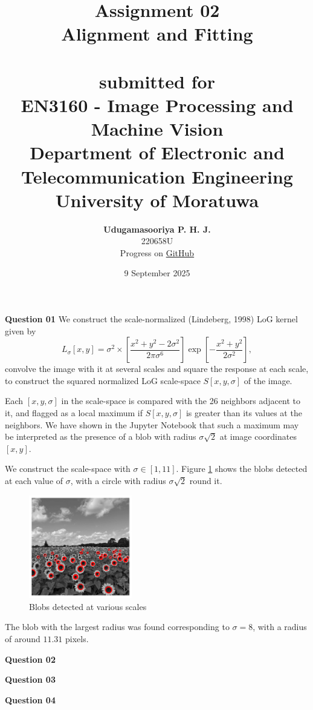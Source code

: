 \documentclass{article}[a4paper]
\title{
	\huge{\textbf{
		Assignment 02
	}}\\
	\Large{
		Alignment and Fitting
	}\\
	\large{\phantom{}}\\
	\large{
		submitted for
	}\\
	\LARGE{
		\textbf{EN3160 - Image Processing and Machine Vision}
	}\\
	\large{
		Department of Electronic and Telecommunication Engineering
	}
	\\
	\large{University of Moratuwa}
}
\author{
	\textbf{Udugamasooriya P. H. J.}\\
	220658U\\
	\small{Progress on \href{https://github.com/pulasthi-u/en3160-assignment02}{GitHub \extlink}}
}
\date{9 September 2025}
\begin{document}
    \maketitle

    \textbf{Question 01} We construct the scale-normalized (Lindeberg, 1998) LoG kernel given by \[
		L_\sigma[x, y] = \sigma^2 \times \left[ \dfrac{x^2 + y^2 - 2\sigma^2}{2\pi\sigma^6}\right] \exp\left[-\dfrac{x^2+y^2}{2\sigma^2}\right],
	\] convolve the image with it at several scales and square the response at each scale, to construct the squared normalized LoG scale-space $S[x, y, \sigma]$ of the image.
	
	Each $[x, y, \sigma]$ in the scale-space is compared with the 26 neighbors adjacent to it, and flagged as a local maximum if $S[x, y, \sigma]$ is greater than its values at the neighbors. We have shown in the Jupyter Notebook that such a maximum may be interpreted as the presence of a blob with radius $\sigma\sqrt{2}$ at image coordinates $[x, y]$.

	We construct the scale-space with $\sigma \in [1, 11]$. Figure \ref{blobs} shows the blobs detected at each value of $\sigma$, with a circle with radius $\sigma\sqrt{2}$ round it.

	\begin{figure}[H]
		\centering
		\includegraphics[width=0.4\textwidth]{imgs/blobs.png}
		\caption{Blobs detected at various scales}
		\label{blobs}
	\end{figure}

	The blob with the largest radius was found corresponding to $\sigma = 8$, with a radius of around $11.31$ pixels.

    \textbf{Question 02}
    
    \textbf{Question 03}

    \textbf{Question 04}
\end{document}
